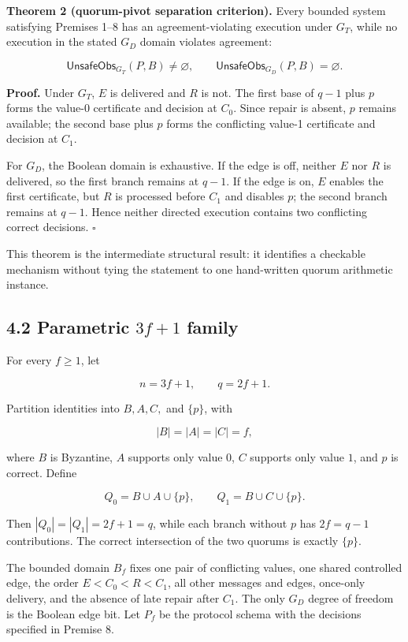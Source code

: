 \documentclass[10pt,a4paper]{article}
\begin{document}
\textbf{Theorem 2 (quorum-pivot separation criterion).} Every bounded
system satisfying Premises 1--8 has an agreement-violating execution
under \(G_T\), while no execution in the stated \(G_D\) domain violates
agreement:

\[
\mathsf{UnsafeObs}_{G_T}(P,B)\neq\varnothing,
\qquad
\mathsf{UnsafeObs}_{G_D}(P,B)=\varnothing.
\]

\textbf{Proof.} Under \(G_T\), \(E\) is delivered and \(R\) is not. The
first base of \(q-1\) plus \(p\) forms the value-0 certificate and
decision at \(C_0\). Since repair is absent, \(p\) remains available;
the second base plus \(p\) forms the conflicting value-1 certificate and
decision at \(C_1\).

For \(G_D\), the Boolean domain is exhaustive. If the edge is off,
neither \(E\) nor \(R\) is delivered, so the first branch remains at
\(q-1\). If the edge is on, \(E\) enables the first certificate, but
\(R\) is processed before \(C_1\) and disables \(p\); the second branch
remains at \(q-1\). Hence neither directed execution contains two
conflicting correct decisions. \(\square\)

This theorem is the intermediate structural result: it identifies a
checkable mechanism without tying the statement to one hand-written
quorum arithmetic instance.

\subsection{\texorpdfstring{4.2 Parametric \(3f+1\)
family}{4.2 Parametric 3f+1 family}}\label{parametric-3f1-family}

For every \(f\geq1\), let

\[
n=3f+1,\qquad q=2f+1.
\]

Partition identities into \(B,A,C,\) and \(\{p\}\), with

\[
|B|=|A|=|C|=f,
\]

where \(B\) is Byzantine, \(A\) supports only value \(0\), \(C\)
supports only value \(1\), and \(p\) is correct. Define

\[
Q_0=B\cup A\cup\{p\},
\qquad
Q_1=B\cup C\cup\{p\}.
\]

Then \(|Q_0|=|Q_1|=2f+1=q\), while each branch without \(p\) has
\(2f=q-1\) contributions. The correct intersection of the two quorums is
exactly \(\{p\}\).

The bounded domain \(B_f\) fixes one pair of conflicting values, one
shared controlled edge, the order \(E<C_0<R<C_1\), all other messages
and edges, once-only delivery, and the absence of late repair after
\(C_1\). The only \(G_D\) degree of freedom is the Boolean edge bit. Let
\(P_f\) be the protocol schema with the decisions specified in Premise
8.
\end{document}
